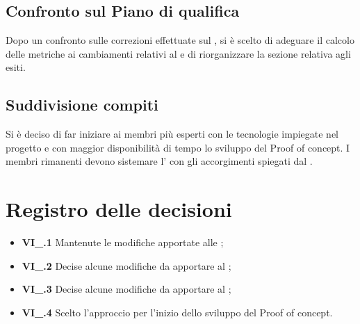 \subsection{Confronto sul Piano di qualifica}
Dopo un confronto sulle correzioni effettuate sul \PdQ{}, si è scelto di adeguare il calcolo delle metriche ai cambiamenti relativi al \PdP{} e di riorganizzare la sezione relativa agli esiti.
\subsection{Suddivisione compiti}
Si è deciso di far iniziare ai membri più esperti con le tecnologie impiegate nel progetto e con maggior disponibilità di tempo lo sviluppo del Proof of concept. I membri rimanenti devono sistemare l'\AdR{} con gli accorgimenti spiegati dal \CR{}.

\section{Registro delle decisioni}
\begin{itemize}
	\item \textbf{VI\_\Data.1} Mantenute le modifiche apportate alle \NdP{};
	\item \textbf{VI\_\Data.2} Decise alcune modifiche da apportare al \PdP{};
	\item \textbf{VI\_\Data.3} Decise alcune modifiche da apportare al \PdQ{};
	\item \textbf{VI\_\Data.4} Scelto l'approccio per l'inizio dello sviluppo del Proof of concept.
\end{itemize}